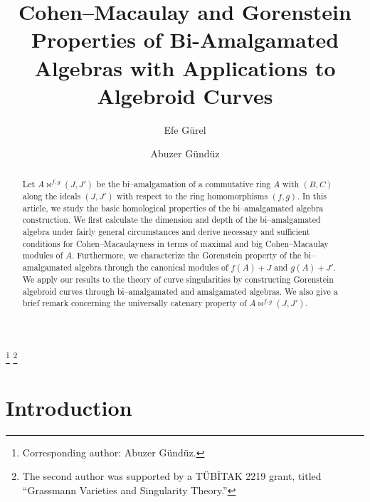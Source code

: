 \documentclass{amsart}%
\theoremstyle{plain}
\numberwithin{equation}{section}
\theoremstyle{definition}
\begin{document}
\title[Properties of Bi-Amalgamated Algebras]{Cohen--Macaulay and Gorenstein Properties of Bi-Amalgamated Algebras with Applications to Algebroid Curves}

\author{Efe G\"urel}
\address{T\"UB\.{I}TAK Natural Sciences High School, 41400 Kocaeli, Turkey}

\author{Abuzer G\"und\"uz}
\address{Department of Mathematics, Sakarya University, 54050 Sakarya, Turkey}
\thanks{Corresponding author: Abuzer G\"und\"uz.}
\thanks{The second author was supported by a T\"UB\.{I}TAK 2219 grant, titled ``Grassmann Varieties and Singularity Theory.''}




\begin{abstract}
Let $A \bowtie^{f,g} (J,J')$ be the bi--amalgamation of a commutative ring $A$ with $(B,C)$ along the ideals $(J,J')$ with respect to the ring homomorphisms $(f,g)$. In this article, we study the basic homological properties of the bi--amalgamated algebra construction. We first calculate the dimension and depth of the bi--amalgamated algebra under fairly general circumstances and derive necessary and sufficient conditions for Cohen--Macaulayness in terms of maximal and big Cohen--Macaulay modules of $A$. Furthermore, we characterize the Gorenstein property of the bi--amalgamated algebra through the canonical modules of $f(A)+J$ and $g(A)+J'$. We apply our results to the theory of curve singularities by constructing Gorenstein algebroid curves through bi--amalgamated and amalgamated algebras. We also give a brief remark concerning the universally catenary property of $A\bowtie^{f,g}(J,J')$.
\end{abstract}
 

\maketitle


\section{Introduction}
\end{document}
